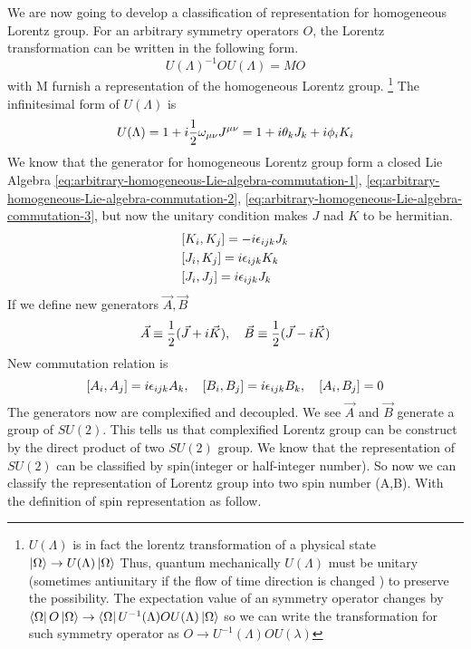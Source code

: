 We are now going to develop a classification of representation for homogeneous Lorentz group. For an arbitrary symmetry operators $O$, the Lorentz transformation can be written in the following form.
\begin{equation}
  U(\Lambda)^{-1} O U(\Lambda) = M O
\end{equation}
with M furnish a representation of the homogeneous Lorentz group.
\footnote{
	$U(\Lambda)$ is in fact the lorentz transformation of a physical state
    $\ket{\Omega} \rightarrow U(\Lambda) \ket{\Omega}$
    Thus, quantum mechanically $U(\Lambda)$ must be unitary (sometimes antiunitary if the flow of time direction is changed ) to preserve the possibility. 
    The expectation value of an symmetry operator changes by 
    $\bra{\Omega}O\ket{\Omega}\rightarrow \bra{\Omega} U^{-1}(\Lambda)O U(\Lambda)\ket{\Omega}$
    so we can write the transformation for such symmetry operator as
    $ O \rightarrow  U^{-1}(\Lambda)O U(\lambda)$
    }
The infinitesimal form of $U(\Lambda)$ is
\begin{equation} \label{infinitesimal form of ULa}
U(\Lambda) = 1 +  i\frac{1}{2} \omega_{\mu\nu}J^{\mu\nu}
=1 +  i \theta_k J_k + i \phi_iK_i
\end{equation}
We know that the generator for homogeneous Lorentz group form a closed Lie Algebra \eqref{eq:arbitrary-homogeneous-Lie-algebra-commutation-1}, \eqref{eq:arbitrary-homogeneous-Lie-algebra-commutation-2}, \eqref{eq:arbitrary-homogeneous-Lie-algebra-commutation-3}, but now the unitary condition makes $J$ nad $K$ to be hermitian.
\begin{align}
&[K_i,K_j] = -i \epsilon_{ijk} J_k
\\
&[J_i,K_j] = i \epsilon_{ijk} K_k
\\
&[J_i,J_j] = i \epsilon_{ijk} J_k
\end{align}
If we define new generators $\vec{A}, \vec{B}$
\begin{equation}
  \vec{A} \equiv \frac{1}{2}(\vec{J}+i\vec{K}),\quad
\vec{B} \equiv \frac{1}{2}(\vec{J}-i\vec{K})
\end{equation}
New commutation relation is
\begin{equation} \label{commutation relation of A and B}
\comm{A_i}{A_j} = i \e_{ijk} A_k,\quad
\comm{B_i}{B_j} = i \e_{ijk} B_k,\quad
\comm{A_i}{B_j} = 0
\end{equation}
The generators now are complexified and decoupled. We see $\vec{A}$ and $\vec{B}$ generate a group of $SU(2)$. This tells us that complexified Lorentz group can be construct by the direct product of two $SU(2)$ group. We know that the representation of $SU(2)$ can be classified by spin(integer or half-integer number). So now we can classify the representation of Lorentz group into two spin number (A,B). With the definition of spin representation as follow.
